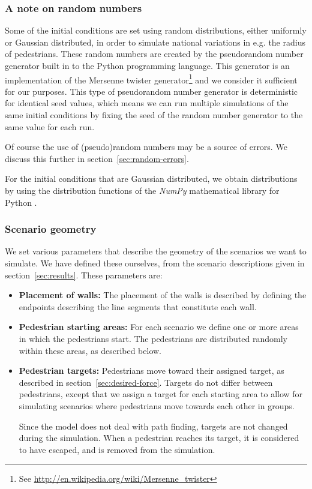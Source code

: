 \subsubsection{A note on random numbers}
Some of the initial conditions are set using random distributions, either 
uniformly or Gaussian distributed, in order to simulate national variations in 
e.g. the radius of pedestrians.  These random numbers are created by the 
pseudorandom number generator built in to the Python programming language.  
This generator is an implementation of the Mersenne twister 
generator\footnote{See \url{http://en.wikipedia.org/wiki/Mersenne\_twister}} 
and we consider it sufficient for our purposes. This type of pseudorandom 
number generator is deterministic for identical seed values, which means we 
can run multiple simulations of the same initial conditions by fixing the seed 
of the random number generator to the same value for each run.

Of course the use of (pseudo)random numbers may be a source of errors. We 
discuss this further in section~\ref{sec:random-errors}.

For the initial conditions that are Gaussian distributed, we obtain 
distributions by using the distribution functions of the \emph{NumPy} 
mathematical library for Python \cite{numpy}.

\subsubsection{Scenario geometry}
We set various parameters that describe the geometry of the scenarios we want 
to simulate. We have defined these ourselves, from the scenario descriptions 
given in section~\ref{sec:results}. These parameters are:

\begin{itemize}
    \item \textbf{Placement of walls:} The placement of the walls is described 
        by defining the endpoints describing the line segments that 
        constitute each wall.

    \item \textbf{Pedestrian starting areas:} For each scenario we define one 
        or more areas in which the pedestrians start. The pedestrians are 
        distributed randomly within these areas, as described below.

    \item \textbf{Pedestrian targets:}  Pedestrians move toward their 
        assigned target, as described in section~\ref{sec:desired-force}. 
        Targets do not differ between pedestrians, except that we assign a 
        target for each starting area to allow for simulating scenarios where 
        pedestrians move towards each other in groups.

        Since the model does not deal with path finding, targets are not 
        changed during the simulation. When a pedestrian reaches its target, 
        it is considered to have escaped, and is removed from the simulation.
\end{itemize}


